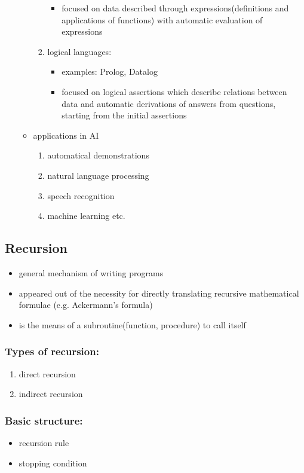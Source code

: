 \documentclass[11pt]{article}
\begin{document}
\begin{enumerate}
\begin{itemize}
\begin{enumerate}
\begin{itemize}
\item focused on data described through expressions(definitions and applications of functions) with automatic evaluation of expressions
\end{itemize}
\item logical languages:
\begin{itemize}
\item examples: Prolog, Datalog
\item focused on logical assertions which describe relations between data and automatic derivations of answers from questions, starting from the initial assertions
\end{itemize}
\end{enumerate}
\item applications in AI
\begin{enumerate}
\item automatical demonstrations
\item natural language processing
\item speech recognition
\item machine learning etc.
\end{enumerate}
\end{itemize}
\end{enumerate}
\subsection{Recursion}
\label{sec:org2cc9a0b}
\begin{itemize}
\item general mechanism of writing programs
\item appeared out of the necessity for directly translating recursive mathematical formulae (e.g. Ackermann's formula)
\item is the means of a subroutine(function, procedure) to call itself
\end{itemize}
\subsubsection{Types of recursion:}
\label{sec:org248ea01}
\begin{enumerate}
\item direct recursion
\item indirect recursion
\end{enumerate}
\subsubsection{Basic structure:}
\label{sec:org39d85ca}
\begin{itemize}
\item recursion rule
\item stopping condition
\end{itemize}
\end{document}
